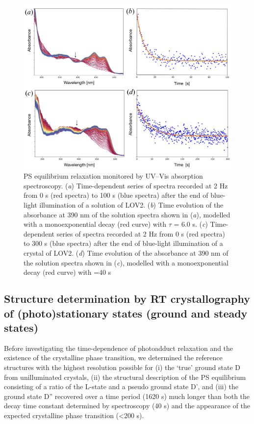\begin{figure}[H] %
    \centering
    \noindent \includegraphics[width=\textwidth]{images/LOV2/LOV2slow_Fig2.pdf}
    \hfill
    \caption{PS equilibrium relaxation monitored by UV–Vis absorption spectroscopy. (\textit{a}) Time-dependent series of spectra recorded at 2 Hz from 0 s (red spectra) to 100 s (blue spectra) after the end of blue-light illumination of a solution of LOV2. (\textit{b}) Time evolution of the absorbance at 390 nm of the solution spectra shown in (\textit{a}), modelled with a monoexponential decay (red curve) with \(\tau\) = 6.0 s. (\textit{c}) Time-dependent series of spectra recorded at 2 Hz from 0 s (red spectra) to 300 s (blue spectra) after the end of blue-light illumination of a crystal of LOV2. (\textit{d}) Time evolution of the absorbance at 390 nm of the solution spectra shown in (\textit{c}), modelled with a monoexponential decay (red curve) with  =40 s}
    \label{fig:LOV2slowespectro}
\end{figure}

\subsection{Structure determination by RT crystallography of (photo)stationary states (ground and steady states)}
Before investigating the time-dependence of photoadduct relaxation and the existence of the crystalline phase transition, we determined the reference structures with the highest resolution possible for (i) the ‘true’ ground state D from unilluminated crystals, (ii) the structural description of the PS equilibrium consisting of a ratio of the L-state and a pseudo ground state D', and (iii) the ground state D'' recovered over a time period (1620 s) much longer than both the decay time constant determined by spectroscopy (40 s) and the appearance of the expected crystalline phase transition (<200 s).
